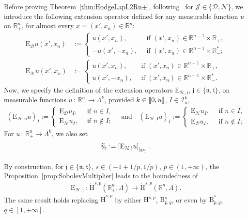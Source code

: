 \documentclass[AHL,Unicode,longabstracts,published]{cedram}
\newcommand{\bbR}{\mathbb{R}}
\newcommand{\rmH}{\mathrm{H}}%
\newcommand{\rmB}{\mathrm{B}}
\newcommand{\rmE}{\mathrm{E}}
\newcommand{\clH}{\mathcal{H}}
\newcommand{\clI}{\mathcal{I}}
\newcommand{\clN}{\mathcal{N}}
\newcommand{\clJ}{\mathcal{J}}
\newcommand{\clD}{\mathcal{D}}
\newcommand{\fkn}{\mathfrak{n}}
\newcommand{\fkt}{\mathfrak{t}}
\newcommand{\fkj}{\mathfrak{j}}
\newcommand{\llbracket}{\mathopen{[\mkern -2.7mu[}}
\newcommand{\rrbracket}{\mathclose{]\mkern -2.7mu]}}
\newcommand{\llb}{\llbracket}
\newcommand{\rrb}{\rrbracket}
\let\oldtilde\tilde
\renewcommand*{\tilde}[1]{\mathchoice{\widetilde{#1}}{\widetilde{#1}}{\oldtilde{#1}}{\oldtilde{#1}}}
\begin{document}
Before proving Theorem~\ref{thm:HodgeLapL2Rn+}, following~\cite[Section~5]{Gaudin2022} for $\clJ\in\{\clD,\clN\}$, we introduce the following extension operator defined for any measurable function $u$ on $\bbR^n_+$, for almost every $x=(x',x_n)\in\bbR^{n}$:
\begin{align*}
\rmE _\clD u (x',x_n) &:=
\begin{cases}
u(x',x_n),\,& \text{ if } (x',x_n)\in\bbR^{n-1}\times\bbR_+,\\
-u(x',-x_n),\,&\text{ if } (x',x_n)\in\bbR^{n-1}\times\bbR_-^*;
\end{cases}\\
\rmE _\clN u (x',x_n) &:=
\begin{cases}
u(x',x_n),\,&\text{ if } (x',x_n)\in\bbR^{n-1}\times\bbR_+,\\
u(x',-x_n),\,& \text{ if } (x',x_n)\in\bbR^{n-1}\times\bbR_-^* .
\end{cases}
\end{align*}
Now, we specify the definition of the extension operators $\rmE _{\clH,\fkj}$, $\fkj\in\{\fkn,\fkt\}$, on measurable functions $u\,:\,\bbR^n_+\longrightarrow \Lambda^k$, provided $k\in\llb 0,n\rrb$, $I\in\clI^{k}_{n}$,
\begin{align}\label{eq:HodgeReflexExtOp}
\left(\rmE _{\clH,\fkn}u\right)_{I}:=
\begin{cases}
\rmE _{\clD}u_{I}, \,&\text{ if } n\in I,\\
\rmE _{\clN}u_{I},\,&\text{ if } n\notin I;
\end{cases}\quad \text{and}\quad \left(\rmE _{\clH,\fkt}u\right)_{I}:=
\begin{cases}
\rmE _{\clN}u_{I},\,&\text{ if } n\in I,\\
\rmE _{\clD}u_{I},\,&\text{ if } n\notin I;
\end{cases}
\end{align}
For $u\,:\,\bbR^n_+\longrightarrow \Lambda^k$, we also set
\begin{align*}
\tilde{u}_{\fkj}:= \left[\rmE _{\clH,\fkj} u\right]_{|_{\bbR^n_{-}}}.
\end{align*}

By construction, for $\fkj\in\{\fkn,\fkt\}$, $s\in (-1+1/p,1/p)$, $p\in(1,+\infty)$, the Proposition~\ref{prop:SobolevMultiplier} leads to the boundedness of
\begin{align}\label{eq:HodgeExtOp}
\rmE _{\clH,\fkj}\,:\, \dot{\rmH}^{s,p}\left(\bbR^n_+,\Lambda\right)\longrightarrow \dot{\rmH}^{s,p}(\bbR^n,\Lambda) .
\end{align}
The same result holds replacing $\dot{\rmH}^{s,p}$ by either ${\rmH}^{s,p}$, ${\rmB}^{s}_{p,q}$, or even by $\dot{\rmB}^{s}_{p,q}$, $q\in[1,+\infty]$.
\end{document}
